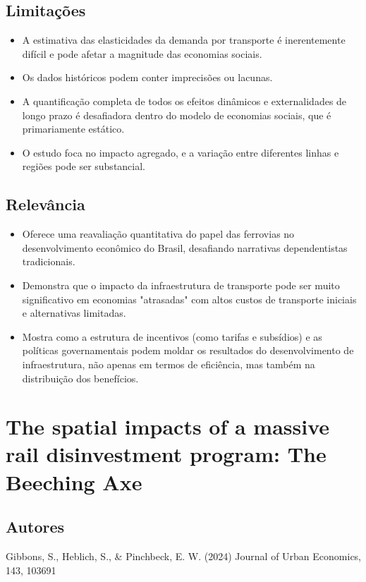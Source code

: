 \documentclass[12pt]{article}
\begin{document}
\subsection*{Limitações}
\begin{itemize}
    \item A estimativa das elasticidades da demanda por transporte é inerentemente difícil e pode afetar a magnitude das economias sociais.
    \item Os dados históricos podem conter imprecisões ou lacunas.
    \item A quantificação completa de todos os efeitos dinâmicos e externalidades de longo prazo é desafiadora dentro do modelo de economias sociais, que é primariamente estático.
    \item O estudo foca no impacto agregado, e a variação entre diferentes linhas e regiões pode ser substancial.
\end{itemize}

\subsection*{Relevância}
\begin{itemize}
    \item Oferece uma reavaliação quantitativa do papel das ferrovias no desenvolvimento econômico do Brasil, desafiando narrativas dependentistas tradicionais.
    \item Demonstra que o impacto da infraestrutura de transporte pode ser muito significativo em economias "atrasadas" com altos custos de transporte iniciais e alternativas limitadas.
    \item Mostra como a estrutura de incentivos (como tarifas e subsídios) e as políticas governamentais podem moldar os resultados do desenvolvimento de infraestrutura, não apenas em termos de eficiência, mas também na distribuição dos benefícios.
\end{itemize}
\newpage

\section{The spatial impacts of a massive rail disinvestment program: The Beeching Axe}

\subsection*{Autores}
Gibbons, S., Heblich, S., \& Pinchbeck, E. W. (2024) Journal of Urban Economics, 143, 103691
\end{document}
